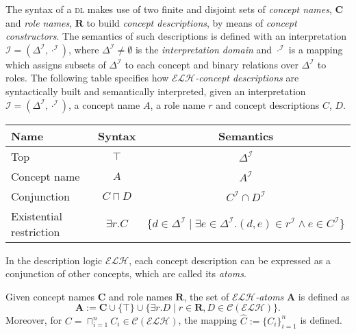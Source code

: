 \documentclass[]{llncs}
\newcommand{\elh}{\(\mathcal{ELH}\)\xspace}
\newcommand{\DeltaI}{\Delta^\mathcal{I}}
\newcommand{\dotI}{\cdot^{\mathcal{I}}}
\newcommand{\dl}{\textsc{dl}\xspace}
\begin{document}
  The syntax of a \dl makes use of two finite and disjoint sets of \emph{concept names}, \(\mathbf{C}\) and \emph{role names}, \(\mathbf{R}\) to build \emph{concept descriptions}, by means of \emph{concept constructors}.
  The semantics of such descriptions is defined with an interpretation \(\mathcal{I} = (\DeltaI,\dotI)\), where \(\DeltaI \ne \emptyset\) is the \emph{interpretation domain} and \(\dotI\) is a mapping which assigns subsets of \(\DeltaI{}\) to each concept and binary relations over \(\DeltaI\) to roles.
  The following table specifies how \emph{\elh-concept descriptions} are syntactically built and semantically interpreted, given an interpretation \(\mathcal{I} = (\DeltaI,\dotI)\), a concept name \(A\), a role name \(r\) and concept descriptions \(C\), \(D\).
  \begin{center}
    \begin{tabular}{lcc}
      \toprule
      Name & Syntax & Semantics \\
      \midrule
      Top & \(\top\) & \(\DeltaI\) \\
      Concept name & \(A\) & \(A^\mathcal{I}\) \\
      Conjunction & \(C \sqcap D\) & \(C^\mathcal{I} \cap D^\mathcal{I}\) \\
      Existential restriction & \(\exists{}r.C\) &
      \(\lbrace d \in \DeltaI \mid \exists e \in \DeltaI.
      (d,e) \in r^\mathcal{I} \land e \in C^\mathcal{I} \rbrace\) \\
      \bottomrule
    \end{tabular}
  \end{center}

  In the description logic \elh, each concept description can be expressed as a conjunction of other concepts, which are called its \emph{atoms}.
  \begin{definition}[Atoms]
    Given concept names \(\mathbf{C}\) and role names \(\mathbf{R}\), the set of \emph{\elh-atoms} \(\mathbf{A}\) is defined as
    \begin{equation}
      \mathbf{A} := \mathbf{C} \cup \lbrace \top \rbrace \cup \lbrace \exists{}r.D \mid r \in \mathbf{R}, D \in \mathcal{C}(\mathcal{ELH}) \rbrace.
    \end{equation}
    Moreover, for \(C = \sqcap_{i=1}^n C_i \in \mathcal{C}(\mathcal{ELH})\), the mapping
    \(\widehat{C} := \lbrace C_i\rbrace_{i=1}^n\) is defined.
  \end{definition}
\end{document}
